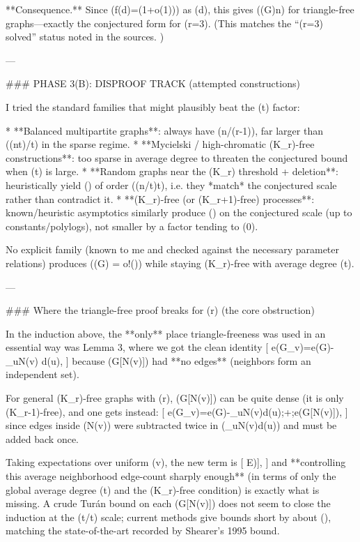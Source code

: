 **Consequence.** Since (f(d)=(1+o(1))) as (d\to\infty), this gives (\alpha(G)\gg {}n) for triangle-free graphs—exactly the conjectured form for (r=3). (This matches the “(r=3) solved” status noted in the sources. )

---

### PHASE 3(B): DISPROOF TRACK (attempted constructions)

I tried the standard families that might plausibly beat the (\log t) factor:

* **Balanced multipartite graphs**: always have (\alpha\ge n/(r-1)), far larger than ((n\log t)/t) in the sparse regime.
* **Mycielski / high-chromatic (K_r)-free constructions**: too sparse in average degree to threaten the conjectured bound when (t) is large.
* **Random graphs near the (K_r) threshold + deletion**: heuristically yield (\alpha) of order ((n/t)\log t), i.e. they *match* the conjectured scale rather than contradict it.
* **(K_r)-free (or (K_{r+1})-free) processes**: known/heuristic asymptotics similarly produce (\alpha) on the conjectured scale (up to constants/polylogs), not smaller by a factor tending to (0).

No explicit family (known to me and checked against the necessary parameter relations) produces (\alpha(G) = o!\left(\right)) while staying (K_r)-free with average degree (t\to\infty).

---

### Where the triangle-free proof breaks for (r) (the core obstruction)

In the induction above, the **only** place triangle-freeness was used in an essential way was Lemma 3, where we got the clean identity
[
e(G_v)=e(G)-\sum_{u\in N(v)} d(u),
]
because (G[N(v)]) had **no edges** (neighbors form an independent set).

For general (K_r)-free graphs with (r), (G[N(v)]) can be quite dense (it is only (K_{r-1})-free), and one gets instead:
[
e(G_v)=e(G)-\sum_{u\in N(v)}d(u);+;e\big(G[N(v)]\big),
]
since edges inside (N(v)) were subtracted twice in (\sum_{u\in N(v)}d(u)) and must be added back once.

Taking expectations over uniform (v), the new term is
[
\mathbb E\big[e(G[N(v)])\big],
]
and **controlling this average neighborhood edge-count sharply enough** (in terms of only the global average degree (t) and the (K_r)-free condition) is exactly what is missing. A crude Turán bound on each (G[N(v)]) does not seem to close the induction at the (\log t/t) scale; current methods give bounds short by about (\log\log), matching the state-of-the-art recorded by Shearer’s 1995 bound.

